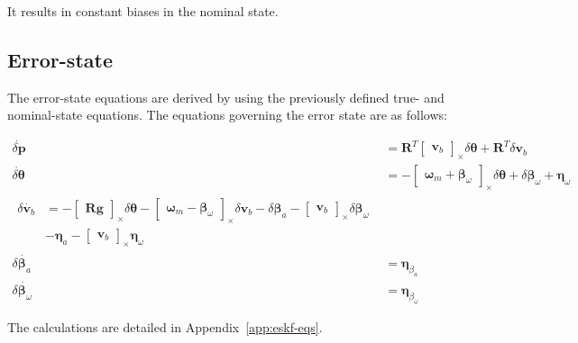 It results in constant biases in the nominal state.

\subsection*{Error-state}

The error-state equations are derived by using the previously defined true- and nominal-state equations. The equations governing the error state are as follows:

\begin{subequations}
\begin{align}
    \dot{\delta \mathbf{p}}&=\mathbf{R}^T \begin{bmatrix}\mathbf{v}_b\end{bmatrix}_\times\delta\boldsymbol{\theta} + \mathbf{R}^T\delta \mathbf{v}_b \\
    \dot{\delta\boldsymbol{\theta}} &=-\begin{bmatrix}\boldsymbol{\omega}_m + \boldsymbol{\beta}_\omega\end{bmatrix}_\times\delta\boldsymbol{\theta} + \delta\boldsymbol{\beta}_\omega + \boldsymbol{\eta}_{\omega} \\
    \begin{split}
    \delta \dot{\mathbf{v}_b}&=-\begin{bmatrix}\mathbf{R}\mathbf{g}\end{bmatrix}_\times\delta\boldsymbol{\theta} -\begin{bmatrix}\boldsymbol{\omega}_m-\boldsymbol{\beta}_\omega\end{bmatrix}_\times\delta \mathbf{v}_b 
    -\delta\boldsymbol{\beta}_a-\begin{bmatrix}\mathbf{v}_b \end{bmatrix}_\times\delta\boldsymbol{\beta}_\omega \\ &
    -\boldsymbol{\eta}_{a}-\begin{bmatrix}\mathbf{v}_b \end{bmatrix}_\times\boldsymbol{\eta}_{\omega}
    \end{split} \\
    \delta\dot{\boldsymbol{\beta}_a}&=\boldsymbol{\eta}_{\beta_a} \\
    \delta\dot{\boldsymbol{\beta}_\omega}&=\boldsymbol{\eta}_{\beta_\omega}
\end{align}\label{eq:error-state}
\end{subequations}

The calculations are detailed in Appendix~\ref{app:eskf-eqs}.

